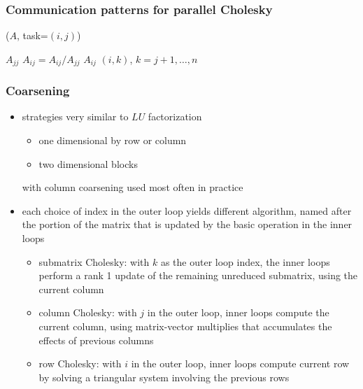 \begin{frame}[fragile]
%
  \frametitle{Communication patterns for parallel Cholesky}
%
  \begin{center}
    \small
    \begin{minipage}{.85\linewidth}
      \begin{algorithm}[H]
        \label{alg:pCholesky}
%
        \dontprintsemicolon
        \setalcaphskip{0ex}
%
        \caption{\cholesky($A$, task=$(i,j)$)}
%
         {
          \KwRecv $A_{jj}$ \;
          $A_{ij} = A_{ij}/A_{jj}$ \;
          \KwBcast $A_{ij}$ \KwTo $(i,k)$, $k=j+1,\ldots,n$
        }
% 
      \end{algorithm}
    \end{minipage}
  \end{center}
%
\end{frame}

\begin{frame}[fragile]
%
  \frametitle{Coarsening}
%
  \begin{itemize}
%
  \item strategies very similar to $LU$ factorization
    \begin{itemize}
    \item one dimensional by row or column
    \item two dimensional blocks
    \end{itemize}
    with column coarsening used most often in practice
%
  \item each choice of index in the outer loop yields different algorithm, named after the
    portion of the matrix that is updated by the basic operation in the inner loops
%
    \begin{itemize}
    \item submatrix Cholesky: with $k$ as the outer loop index, the inner loops perform a rank
      1 update of the remaining unreduced submatrix, using the current column
    \item column Cholesky: with $j$ in the outer loop, inner loops compute the current column,
      using matrix-vector multiplies that accumulates the effects of previous columns
    \item row Cholesky: with $i$ in the outer loop, inner loops compute current row by solving
      a triangular system involving the previous rows
    \end{itemize}
%
  \end{itemize}
%
\end{frame}


